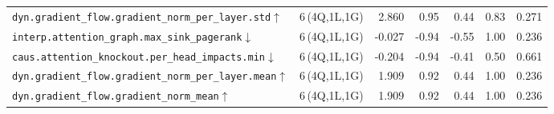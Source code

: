 \begin{tabular}{@{}lrrrrrr@{}}
\texttt{dyn.gradient\_flow.gradient\_norm\_per\_layer.std}$\uparrow$ & 6\,\scriptsize{(4Q,1L,1G)} & 2.860 & 0.95 & 0.44 & 0.83 & 0.271 \\
\texttt{interp.attention\_graph.max\_sink\_pagerank}$\downarrow$ & 6\,\scriptsize{(4Q,1L,1G)} & -0.027 & -0.94 & -0.55 & 1.00 & 0.236 \\
\texttt{caus.attention\_knockout.per\_head\_impacts.min}$\downarrow$ & 6\,\scriptsize{(4Q,1L,1G)} & -0.204 & -0.94 & -0.41 & 0.50 & 0.661 \\
\texttt{dyn.gradient\_flow.gradient\_norm\_per\_layer.mean}$\uparrow$ & 6\,\scriptsize{(4Q,1L,1G)} & 1.909 & 0.92 & 0.44 & 1.00 & 0.236 \\
\texttt{dyn.gradient\_flow.gradient\_norm\_mean}$\uparrow$ & 6\,\scriptsize{(4Q,1L,1G)} & 1.909 & 0.92 & 0.44 & 1.00 & 0.236 \\
\bottomrule
\end{tabular}